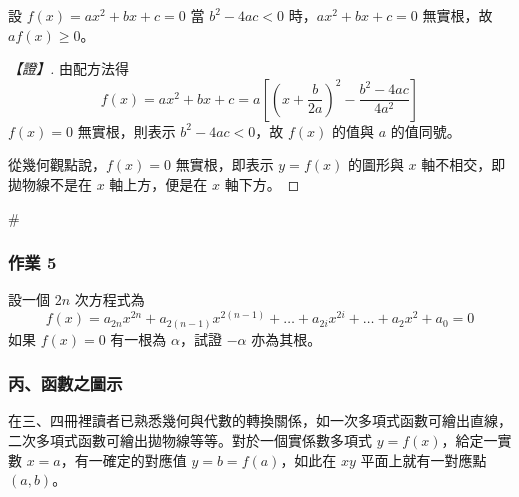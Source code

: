 \begin{example}\label{ex:b6-2-5}
設 $f(x)=ax^2+bx+c=0$ 當 $b^2-4ac < 0$ 時，$ax^2+bx+c=0$ 無實根，故 $a f(x) \ge 0$。
\end{example}

\begin{proof}[【證】]
由配方法得
\[ f(x) = ax^2+bx+c = a \left[ \left(x+\dfrac{b}{2a}\right)^2 - \dfrac{b^2-4ac}{4a^2} \right] \]
$f(x)=0$ 無實根，則表示 $b^2-4ac < 0$，故 $f(x)$ 的值與 $a$ 的值同號。

\begin{figure}[H]
\centering
{}
\end{figure}
從幾何觀點說，$f(x)=0$ 無實根，即表示 $y=f(x)$ 的圖形與 $x$ 軸不相交，即拋物線不是在 $x$ 軸上方，便是在 $x$ 軸下方。
\end{proof}\hfill$\#$

\subsubsection*{作業 5}\label{hw:b6-2-5}
設一個 $2n$ 次方程式為
\[ f(x) = a_{2n} x^{2n} + a_{2(n-1)} x^{2(n-1)} + \dots + a_{2i} x^{2i} + \dots + a_2 x^2 + a_0 = 0 \]
如果 $f(x)=0$ 有一根為 $\alpha$，試證 $-\alpha$ 亦為其根。

\subsubsection*{丙、函數之圖示}\label{subsec:b6-2-2-c}

在三、四冊裡讀者已熟悉幾何與代數的轉換關係，如一次多項式函數可繪出直線，二次多項式函數可繪出拋物線等等。對於一個實係數多項式 $y=f(x)$，給定一實數 $x=a$，有一確定的對應值 $y=b=f(a)$，如此在 $xy$ 平面上就有一對應點 $(a, b)$。

